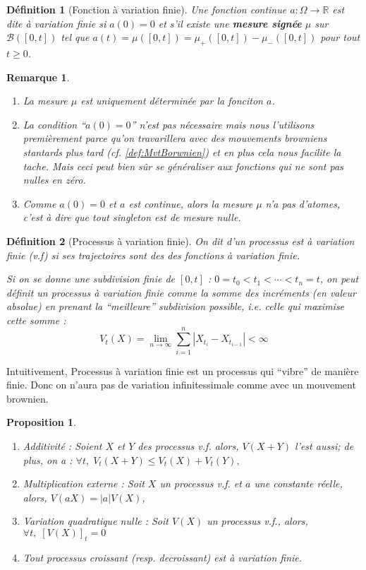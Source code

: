 \documentclass[openany]{book}
\newcommand{\R}{\mathbb{R}}
\newcommand{\1}{\mathbbm{1}}
\theoremstyle{thmfont}
\theoremstyle{deffont}
\newtheorem{definition}[definition]{Définition}
\theoremstyle{thmfont}
\newtheorem{prop}[prop]{Proposition}
\theoremstyle{deffont}
\newtheorem*{remark}{Remarque}
\begin{document}
\begin{definition}[Fonction à variation finie] Une fonction continue $a : \Omega \rightarrow \R$ est dite \textit{à variation finie} si $a(0) = 0$ et s'il existe une \textbf{mesure signée} $\mu$ sur $\mathcal B([0,t])$ tel que $a(t) = \mu([0,t]) = \mu_+([0,t]) - \mu_-([0,t])$ pour tout $t \geq 0$.
\label{def:fct_var_finie}
\end{definition}

\begin{remark}
  \begin{enumerate}
  \item La mesure $\mu$ est uniquement déterminée par la fonciton $a$.
  \item La condition ``$a(0)=0$'' n'est pas nécessaire mais nous l'utilisons premièrement parce qu'on travarillera avec des mouvements browniens stantards plus tard (cf. \autoref{def:MvtBorwnien}) et en plus cela nous facilite la tache. Mais ceci peut bien sûr se généraliser aux fonctions qui ne sont pas nulles en zéro.
  \item Comme $a(0) = 0$ et $a$ est continue, alors la mesure $\mu$ n'a pas d'\textit{atomes}, c'est à dire que tout singleton est de mesure nulle.
  \end{enumerate}
\end{remark}

\begin{definition}[Processus à variation finie]
  On dit d'un processus est \textit{à variation finie} (v.f) si ses trajectoires sont des des fonctions à variation finie.

  Si on se donne une subdivision finie de $[0,t]$ :  $0 = t_0 < t_1 < \cdots < t_n = t$, on peut définit un processus à variation finie comme la somme des incréments (en valeur absolue) en prenant la ``meilleure'' subdivision possible, i.e. celle qui maximise cette somme :
  $$ V_t(X) = \lim_{n \to \infty} \sum_{i=1}^n |X_{t_i} - X_{t_{i-1}}| < \infty$$
\end{definition}

Intuitivement, Processus à variation finie est un processus qui ``vibre'' de manière finie. Donc on n'aura pas de variation infinitessimale comme avec un mouvement brownien.

\begin{prop}
  \begin{enumerate}[nosep]
  \item Additivité : Soient $X$ et $Y$ des processus v.f. alors, $V(X+Y)$ l'est aussi; de plus, on a : $\forall t, \; V_t(X+Y) \leq V_t(X)+V_t(Y),$
  \item Multiplication externe : Soit $X$ un processus v.f. et $a$ une constante réelle, alors, $V(aX) = |a| V(X)$,
  \item Variation quadratique nulle : Soit $V(X)$ un processus v.f., alors,\\ $\forall t,\; [V(X)]_t=0$
  \item Tout processus croissant (resp. decroissant) est à variation finie.
  \end{enumerate}
\end{prop}
\end{document}
